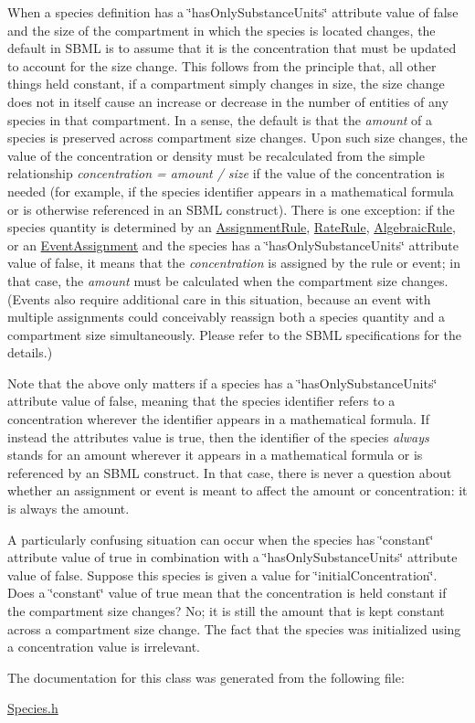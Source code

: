 When a species definition has a \char`\"{}has\+Only\+Substance\+Units\char`\"{} attribute value of {\ttfamily false} and the size of the compartment in which the species is located changes, the default in S\+B\+ML is to assume that it is the concentration that must be updated to account for the size change. This follows from the principle that, all other things held constant, if a compartment simply changes in size, the size change does not in itself cause an increase or decrease in the number of entities of any species in that compartment. In a sense, the default is that the {\itshape amount} of a species is preserved across compartment size changes. Upon such size changes, the value of the concentration or density must be recalculated from the simple relationship {\itshape concentration = amount / size} if the value of the concentration is needed (for example, if the species identifier appears in a mathematical formula or is otherwise referenced in an S\+B\+ML construct). There is one exception\+: if the species\textquotesingle{} quantity is determined by an \hyperlink{class_assignment_rule}{Assignment\+Rule}, \hyperlink{class_rate_rule}{Rate\+Rule}, \hyperlink{class_algebraic_rule}{Algebraic\+Rule}, or an \hyperlink{class_event_assignment}{Event\+Assignment} and the species has a \char`\"{}has\+Only\+Substance\+Units\char`\"{} attribute value of {\ttfamily false}, it means that the {\itshape concentration} is assigned by the rule or event; in that case, the {\itshape amount} must be calculated when the compartment size changes. (Events also require additional care in this situation, because an event with multiple assignments could conceivably reassign both a species quantity and a compartment size simultaneously. Please refer to the S\+B\+ML specifications for the details.)

Note that the above only matters if a species has a \char`\"{}has\+Only\+Substance\+Units\char`\"{} attribute value of {\ttfamily false}, meaning that the species identifier refers to a concentration wherever the identifier appears in a mathematical formula. If instead the attribute\textquotesingle{}s value is {\ttfamily true}, then the identifier of the species {\itshape always} stands for an amount wherever it appears in a mathematical formula or is referenced by an S\+B\+ML construct. In that case, there is never a question about whether an assignment or event is meant to affect the amount or concentration\+: it is always the amount.

A particularly confusing situation can occur when the species has \char`\"{}constant\char`\"{} attribute value of {\ttfamily true} in combination with a \char`\"{}has\+Only\+Substance\+Units\char`\"{} attribute value of {\ttfamily false}. Suppose this species is given a value for \char`\"{}initial\+Concentration\char`\"{}. Does a \char`\"{}constant\char`\"{} value of {\ttfamily true} mean that the concentration is held constant if the compartment size changes? No; it is still the amount that is kept constant across a compartment size change. The fact that the species was initialized using a concentration value is irrelevant. 

The documentation for this class was generated from the following file\+:\begin{DoxyCompactItemize}
\item 
\hyperlink{_species_8h}{Species.\+h}\end{DoxyCompactItemize}
